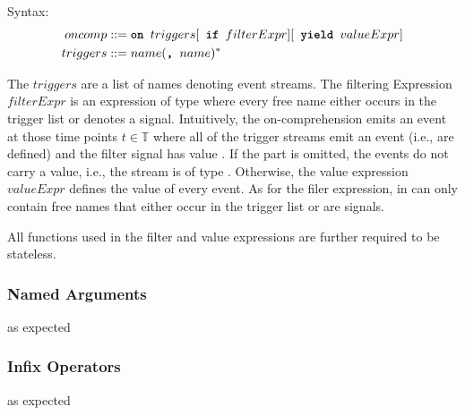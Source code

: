 Syntax:
\begin{align*}
  oncomp   &::= \texttt{\textbf{on }} triggers [\texttt{\textbf{ if }} filterExpr] [\texttt{\textbf{ yield }} valueExpr] \\
  triggers &::= name(\texttt{\textbf{, }} name)^*
\end{align*}

The $triggers$ are a list of names denoting event streams. 
The filtering Expression $filterExpr$ is an expression of type  where every free name either occurs in the trigger list or denotes a signal. 
Intuitively, the on-comprehension emits an event at those time points $t∈𝕋$ where all of the trigger streams emit an event (i.e., are defined) and the filter signal has value .
If the  part is omitted, the events do not carry a value, i.e., the stream is of type . 
Otherwise, the value expression $valueExpr$ defines the value of every event. 
As for the filer expression, in can only contain free names that either occur in the trigger list or are signals.

All functions used in the filter and value expressions are further required to be stateless.

\subsubsection{Named Arguments}

as expected

\subsubsection{Infix Operators}

as expected

